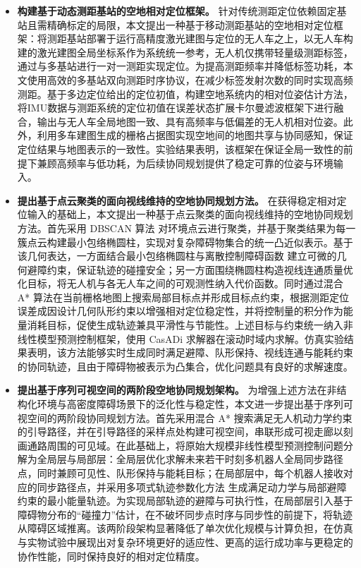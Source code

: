\begin{itemize}
    \item \textbf{构建基于动态测距基站的空地相对定位框架。}
    针对传统测距定位依赖固定基站且需精确标定的局限，本文提出一种基于移动测距基站的空地相对定位框架：将测距基站部署于运行高精度激光建图与定位的无人车之上，以无人车构建的激光建图全局坐标系作为系统统一参考，无人机仅携带轻量级测距标签，通过与多基站进行一对一测距实现定位。为提高测距频率并降低标签功耗，本文使用高效的多基站双向测距时序协议，在减少标签发射次数的同时实现高频测距。基于多边定位给出的定位初值，构建空地系统内的相对位姿估计方法，将IMU数据与测距系统的定位初值在误差状态扩展卡尔曼滤波框架下进行融合，输出与无人车全局地图一致、具有高频率与低偏差的无人机相对位姿。此外，利用多车建图生成的栅格占据图实现空地间的地图共享与协同感知，保证定位结果与地图表示的一致性。实验结果表明，该框架在保证全局一致性的前提下兼顾高频率与低功耗，为后续协同规划提供了稳定可靠的位姿与环境输入。

    \item \textbf{提出基于点云聚类的面向视线维持的空地协同规划方法。}
    在获得稳定相对定位输入的基础上，本文提出一种基于点云聚类的面向视线维持的空地协同规划方法。首先采用 DBSCAN 算法\cite{dbscan} 对环境点云进行聚类，并基于聚类结果为每一簇点云构建最小包络椭圆柱，实现对复杂障碍物集合的统一凸近似表示。基于该几何表达，一方面结合最小包络椭圆柱与离散控制障碍函数\cite{dcbf} 建立可微的几何避障约束，保证轨迹的碰撞安全；另一方面围绕椭圆柱构造视线连通质量优化目标，将无人机与各无人车之间的可观测性纳入代价函数。同时通过混合 A* 算法在当前栅格地图上搜索局部目标点并形成目标点约束，根据测距定位误差成因设计几何队形约束以增强相对定位稳定性，并将控制量的积分作为能量消耗目标，促使生成轨迹兼具平滑性与节能性。上述目标与约束统一纳入非线性模型预测控制框架，使用 CasADi\cite{casadi} 求解器在滚动时域内求解。仿真实验结果表明，该方法能够实时生成同时满足避障、队形保持、视线连通与能耗约束的协同轨迹，且由于障碍物被表示为凸集合，优化问题具有良好的求解速度。

    \item \textbf{提出基于序列可视空间的两阶段空地协同规划架构。}
    为增强上述方法在非结构化环境与高密度障碍场景下的泛化性与稳定性，本文进一步提出基于序列可视空间的两阶段协同规划方法。首先采用混合 A* 搜索满足无人机动力学约束的引导路径，并在引导路径的采样点处构建可视空间，串联形成可视走廊以刻画通路周围的可见域。在此基础上，将原始大规模非线性模型预测控制问题分解为全局层与局部层：全局层优化求解未来若干时刻多机器人全局同步路径点，同时兼顾可见性、队形保持与能耗目标；在局部层中，每个机器人接收对应的同步路径点，并采用多项式轨迹参数化方法\cite{wang2022geometrically} 生成满足动力学与局部避障约束的最小能量轨迹。为实现局部轨迹的避障与可执行性，在局部层引入基于障碍物分布的“碰撞力”估计，在不破坏同步点时序与同步性的前提下，将轨迹从障碍区域推离。该两阶段架构显著降低了单次优化规模与计算负担，在仿真与实物试验中展现出对复杂环境更好的适应性、更高的运行成功率与更稳定的协作性能，同时保持良好的相对定位精度。
\end{itemize}

